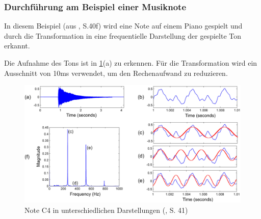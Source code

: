 
\par

\subsubsection{Durchführung am Beispiel einer Musiknote}

In diesem Beispiel (aus \cite{fundamentals_of_music_processing}, S.40f) wird eine Note auf einem Piano gespielt und durch die Transformation in eine frequentielle Darstellung der gespielte Ton erkannt.

\par


Die Aufnahme des Tons ist in \cref{fig:fourier}(a) zu erkennen. Für die Transformation wird ein Ausschnitt von 10ms verwendet, um den Rechenaufwand zu reduzieren.

%
\begin{figure}[h]
    \includegraphics[width=1\textwidth]{images/Fourier_math.PNG}
    \caption{Note C4 in unterschiedlichen Darstellungen (\cite{fundamentals_of_music_processing}, S. 41)}
    \label{fig:fourier}
    \end{figure}
\par

